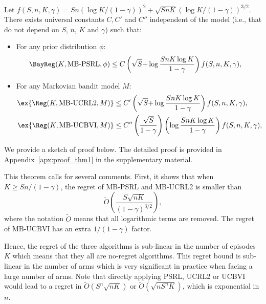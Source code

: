 \begin{thm}
    \label{thm:regret_upper_bound}
    Let $f(S,n,K,\gamma)=Sn\left(\log K/(1{-}\gamma)\right)^{2}+ \sqrt{SnK}\left(\log K/(1{-}\gamma)\right)^{3/2}$. There exists universal constants $C, C'$ and $C''$ independent of the model (i.e., that do not depend on $S$, $n$, $K$ and $\gamma$) such that:
    \begin{itemize}
        \item For any prior distribution $\phi$:
        \begin{align*}
            \BayReg(K,\text{MB-PSRL},\phi) &\le C\left(\sqrt{S} {+}\log\frac{SnK\log K}{1-\gamma}\right) f(S,n,K,\gamma),
        \end{align*}
        \item For any Markovian bandit model $M$:
    \begin{align*}
        \ex{\Reg(K,\text{MB-UCRL2},M)} &\le C'\left(\sqrt{S} {+}\log\frac{SnK\log K}{1-\gamma}\right) f(S,n,K,\gamma),\\
        \ex{\Reg(K,\text{MB-UCBVI},M)} &\le C''\left(\frac{\sqrt{S}}{1-\gamma}\right)\left(\log\frac{SnK\log K}{1-\gamma}\right) f(S,n,K,\gamma),
    \end{align*}
    \end{itemize}
\end{thm}

We provide a sketch of proof below. The detailed proof is provided in Appendix~\ref{apx:proof_thm1} in the supplementary material.

This theorem calls for several comments. First, it shows that when $K\ge Sn/(1-\gamma)$, the regret of MB-PSRL and MB-UCRL2 is smaller than 
\begin{equation}
    \label{eq:regret_tilde}
    \tilde{O}\left(\frac{S\sqrt{nK}}{(1-\gamma)^{3/2}}\right),
\end{equation}
where the notation $\tilde{O}$ means that all logarithmic terms are removed. The regret of MB-UCBVI has an extra $1/(1-\gamma)$ factor. 

Hence, the regret of the three algorithms is sub-linear in the number of episodes $K$ which means that they all  are no-regret algorithms. This regret bound is sub-linear in the number of arms which is very significant in practice when facing a large number of arms. Note that directly applying PSRL, UCRL2 or UCBVI would lead to a regret in   $\tilde{O}\left(S^n\sqrt{nK}\right)$ or $\tilde{O}\left(\sqrt{nS^nK}\right)$,  which is exponential in $n$.

